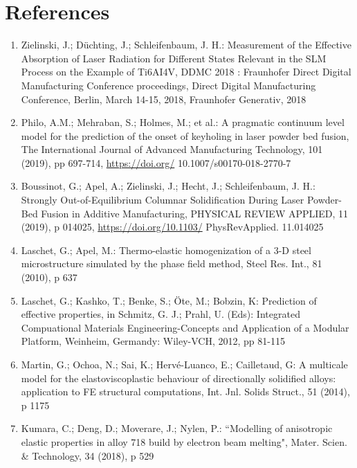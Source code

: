 \documentclass[10pt]{article}
\begin{document}
\section*{References}
\begin{enumerate}
  \item Zielinski, J.; Düchting, J.; Schleifenbaum, J. H.: Measurement of the Effective Absorption of Laser Radiation for Different States Relevant in the SLM Process on the Example of Ti6AI4V, DDMC 2018 : Fraunhofer Direct Digital Manufacturing Conference proceedings, Direct Digital Manufacturing Conference, Berlin, March 14-15, 2018, Fraunhofer Generativ, 2018

  \item Philo, A.M.; Mehraban, S.; Holmes, M.; et al.: A pragmatic continuum level model for the prediction of the onset of keyholing in laser powder bed fusion, The International Journal of Advanced Manufacturing Technology, 101 (2019), pp 697-714, \href{https://doi.org/}{https://doi.org/} 10.1007/s00170-018-2770-7

  \item Boussinot, G.; Apel, A.; Zielinski, J.; Hecht, J.; Schleifenbaum, J. H.: Strongly Out-of-Equilibrium Columnar Solidification During Laser Powder-Bed Fusion in Additive Manufacturing, PHYSICAL REVIEW APPLIED, 11 (2019), p 014025, \href{https://doi.org/10.1103/}{https://doi.org/10.1103/} PhysRevApplied. 11.014025

  \item Laschet, G.; Apel, M.: Thermo-elastic homogenization of a 3-D steel microstructure simulated by the phase field method, Steel Res. Int., 81 (2010), p 637

  \item Laschet, G.; Kashko, T.; Benke, S.; Öte, M.; Bobzin, K: Prediction of effective properties, in Schmitz, G. J.; Prahl, U. (Eds): Integrated Compuational Materials Engineering-Concepts and Application of a Modular Platform, Weinheim, Germandy: Wiley-VCH, 2012, pp 81-115

  \item Martin, G.; Ochoa, N.; Sai, K.; Hervé-Luanco, E.; Cailletaud, G: A multicale model for the elastoviscoplastic behaviour of directionally solidified alloys: application to FE structural computations, Int. Jnl. Solids Struct., 51 (2014), p 1175

  \item Kumara, C.; Deng, D.; Moverare, J.; Nylen, P.: “Modelling of anisotropic elastic properties in alloy 718 build by electron beam melting", Mater. Scien. \& Technology, 34 (2018), p 529


\end{enumerate}
\end{document}
